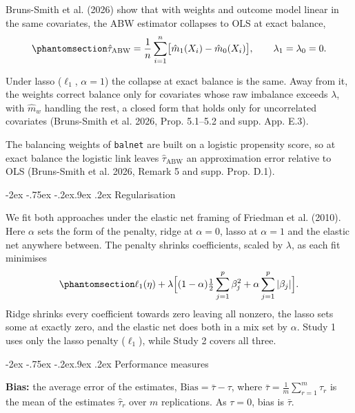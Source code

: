 \documentclass[
  12pt,
  a4paper,
]{article}
\makeatletter
\renewcommand\subsection{\@startsection{subsection}{2}{\z@}%
  {-2ex \@plus -.75ex \@minus -.2ex}{.9ex \@plus .2ex}%
  {\normalfont\large\bfseries}}
\makeatother
\begin{document}
\begin{enumerate}
  Bruns-Smith et al. (2026) show that with weights and outcome model
  linear in the same covariates, the ABW estimator collapses to OLS at
  exact balance,
  \begin{equation}\protect\phantomsection\label{eq-abw-ols}{ \hat\tau_{\mathrm{ABW}} = \frac{1}{n}\sum_{i=1}^{n}\bigl[\hat m_1(X_i) - \hat m_0(X_i)\bigr], \qquad \lambda_1 = \lambda_0 = 0. }\end{equation}

  Under lasso (\(\ell_1\), \(\alpha = 1\)) the collapse at exact balance
  is the same. Away from it, the weights correct balance only for
  covariates whose raw imbalance exceeds \(\lambda\), with \(\hat m_w\)
  handling the rest, a closed form that holds only for uncorrelated
  covariates (Bruns-Smith et al. 2026, Prop. 5.1--5.2 and supp. App.
  E.3).

  The balancing weights of \texttt{balnet} are built on a logistic
  propensity score, so at exact balance the logistic link leaves
  \(\hat\tau_{\mathrm{ABW}}\) an approximation error relative to OLS
  (Bruns-Smith et al. 2026, Remark 5 and supp. Prop. D.1).
\end{enumerate}

\subsection{Regularisation}\label{regularisation}

We fit both approaches under the elastic net framing of Friedman et al.
(2010). Here \(\alpha\) sets the form of the penalty, ridge at
\(\alpha = 0\), lasso at \(\alpha = 1\) and the elastic net anywhere
between. The penalty shrinks coefficients, scaled by \(\lambda\), as
each fit minimises
\begin{equation}\protect\phantomsection\label{eq-enet}{\ell_1(\eta) + \lambda \Big[ (1 - \alpha)\tfrac{1}{2} \sum_{j=1}^{p} \beta_j^2 + \alpha \sum_{j=1}^{p} |\beta_j| \Big].}\end{equation}
Ridge shrinks every coefficient towards zero leaving all nonzero, the
lasso sets some at exactly zero, and the elastic net does both in a mix
set by \(\alpha\). Study 1 uses only the lasso penalty (\(\ell_1\)),
while Study 2 covers all three.

\subsection{Performance measures}\label{sec-s1-measures}

\textbf{Bias:} the average error of the estimates,
\(\mathrm{Bias} = \bar\tau - \tau\), where
\(\bar\tau = \frac{1}{m}\sum_{r=1}^{m}\hat\tau_r\) is the mean of the
estimates \(\hat\tau_r\) over \(m\) replications. As \(\tau = 0\), bias
is \(\bar\tau\).
\end{document}
